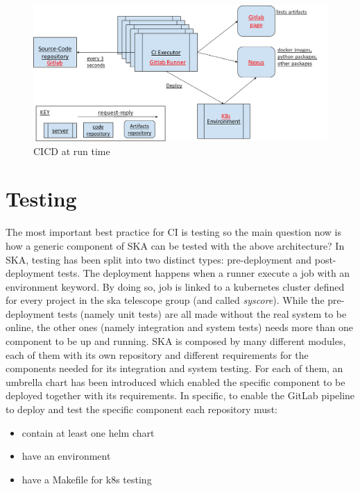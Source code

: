 \documentclass[a4paper]{spie}  %
\begin{document}
\begin{figure}[!htb]
   \centering
   \includegraphics*[width=0.8\columnwidth]{CICD runtime}
   \caption{CICD at run time}
   \label{fig:cicdruntime}
\end{figure}

\section{Testing}
The most important best practice for CI is testing so the main question now is how a generic component of SKA can be tested with the above architecture?
In SKA, testing has been split into two distinct types: pre-deployment and post-deployment tests. The deployment happens when a runner execute a job with an environment keyword. By doing so, job is linked to a kubernetes cluster defined for every project in the ska telescope group (and called \textit{syscore}). 
While the pre-deployment tests (namely unit tests) are all made without the real system to be online, the other ones (namely integration and system tests) needs more than one component to be up and running. 
SKA is composed by many different modules, each of them with its own repository and different requirements for the components needed for its integration and system testing. For each of them, an umbrella chart has been introduced which enabled the specific component to be deployed together with its requirements.
In specific, to enable the GitLab pipeline to deploy and test the specific component each repository must:
\begin{itemize}
    \item contain at least one helm chart
    \item have an environment
    \item have a Makefile for k8s testing
\end{itemize}
\end{document}
